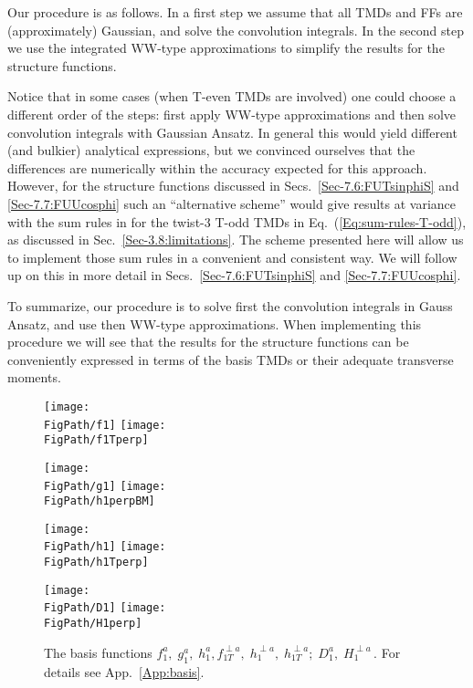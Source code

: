 \documentclass[a4paper,11pt]{article}
\newcommand{\red}[1]{{\color{red} #1}}
\newcommand*{\FigPath}{./figs}%
\begin{document}
{Our procedure is as follows. In a first step we assume that all TMDs and 
FFs are (approximately) Gaussian, and solve the convolution integrals.
In the second step we use the integrated WW-type approximations to
simplify the results for the structure functions.

Notice that in some cases (when T-even TMDs are involved) 
one could choose a different order of the steps: first apply 
WW-type approximations and then solve convolution integrals 
with Gaussian Ansatz.
In general this would yield different (and bulkier) analytical 
expressions, but we convinced ourselves that the differences 
are numerically within the accuracy expected for this approach.
\red{However, for the structure functions discussed in
Secs.~\ref{Sec-7.6:FUTsinphiS} and \ref{Sec-7.7:FUUcosphi}
such an ``alternative scheme'' would give results at
variance with the sum rules in for the twist-3 T-odd TMDs
in Eq.~(\ref{Eq:sum-rules-T-odd}), as discussed in 
Sec.~\ref{Sec-3.8:limitations}. 
The scheme presented here will allow us to implement those sum 
rules in a convenient and consistent way. We will follow up on 
this in more detail in 
Secs.~\ref{Sec-7.6:FUTsinphiS} and \ref{Sec-7.7:FUUcosphi}.}

To summarize, our procedure is to solve first the convolution 
integrals in Gauss Ansatz, and use then WW-type approximations.
When implementing this procedure we will see that the results 
for the structure functions can be conveniently expressed in 
terms of the basis TMDs or their adequate transverse moments. 
}

\newpage

\begin{figure}[b!]
\centering
\texttt{[image: \\FigPath/f1]} 
\texttt{[image: \\FigPath/f1Tperp]}
  
\texttt{[image: \\FigPath/g1]}  
\texttt{[image: \\FigPath/h1perpBM]}  

\texttt{[image: \\FigPath/h1]}  
\texttt{[image: \\FigPath/h1Tperp]}


\texttt{[image: \\FigPath/D1]} 
\texttt{[image: \\FigPath/H1perp]} 
\caption{\label{basis} 
	The basis functions $f_1^a, \; g_1^a, \; h_1^a, 
	f_{1T}^{\perp a}, \;h_1^{\perp a},\; h_{1T}^{\perp a}; \; 
	D_1^a, \; H_1^{\perp a} \,$. For details see App.~\ref{App:basis}.}
\end{figure}
\end{document}
